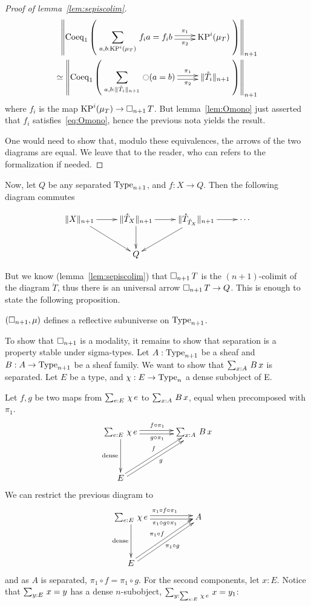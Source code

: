 \begin{proof}[Proof of lemma~\ref{lem:sepiscolim}]
  \[
    \begin{split}
    \left\|\mathrm{Coeq}_1 \left( 
      \xymatrix{
        \displaystyle{\sumD {a,b}{\KP^i(\mu_T)} {f_{i} a = f_{i} b}} \ar@<-.5ex>[r]_-{\pi_2} \ar@<.5ex>[r]^-{\pi_1} & \KP^i(\mu_T)
      }
    \right)\right\|_{n+1}
    \\ \simeq 
    \left\|\mathrm{Coeq}_1 \left( 
      \xymatrix{\displaystyle{\sumD {a,b} {\|\mathring T_i\|_{n+1}} {\modal (a=b)}} \ar@<-.5ex>[r]_-{\pi_2} \ar@<.5ex>[r]^-{\pi_1} & \|\mathring T_i\|_{n+1}}
    \right)\right\|_{n+1}
    \end{split}
  \]
  where $f_{i}$ is the map $\operatorname{KP}^i(\mu_T) \to \mathop{\square_{n+1}} T$. But
  lemma~\ref{lem:Omono} just asserted that $f_i$
  satisfies~\ref{eq:Omono}, hence the previous nota yields the result.
  
  One would need to show that, modulo these equivalences, the arrows
  of the two diagrams are equal. We leave that to the reader, who can
  refers to the formalization if needed.
\end{proof}

Now, let $Q$ be any separated $\operatorname{Type}_{n+1}$, and $f:X \to Q$. Then the
following diagram commutes

\[\xymatrix{
\|X\|_{n+1} \ar[r] \ar[rd] & \|\mathring T_{X}\|_{n+1} \ar[r] \ar[d] & \|\mathring
  T_{\mathring T_X} \|_{n+1} \ar[ld] \ar[r] & \cdots \\
  & Q &&
} \]%

But we know (lemma~\ref{lem:sepiscolim}) that $\mathop{\square_{n+1}} T$ is the
$(n+1)$-colimit of the diagram $\mathring T$, thus there is an universal
arrow $\mathop{\square_{n+1}} T \to Q$.
%
This is enough to state the following proposition.
\begin{prop}\label{prop:sep-subu}
  $(\mathop{\square_{n+1}},\mu)$ defines a reflective subuniverse on $\operatorname{Type}_{n+1}$.
\end{prop}

To show that $\mathop{\square_{n+1}}$ is a modality, it remains to show that
separation is a property stable under sigma-types.
%
Let $A:\operatorname{Type}_{n+1}$ be a sheaf and $B:A \to \operatorname{Type}_{n+1}$ be a sheaf
family. We want to show that $\sum_{x:A}\, B\, x$ is separated. Let $E$
be a type, and $\chi:E\to\operatorname{Type}_n$ a dense subobject of E.

Let $f,g$ be two maps from $\sum_{e:E}\, \chi\,e$ to $\sum_{x:A}\, B\, x$, equal when precomposed with $\pi_1$.
\[\xymatrix @R=4em @C=4em{
  \sumD e E {\chi\, e} \ar@<-2pt>[r]_{g\circ\pi_1}
  \ar@<2pt>[r]^{f\circ \pi_1} \ar[d]_{\mathrm{dense}}& \sumD x A {B\, x} \\
  E \ar@<-2pt>[ru]_{g} \ar@<2pt>[ru]^{f}&
}\]%
We can restrict the previous diagram to 
\[\xymatrix @R=4em @C=5em{
  \sumD e E {\chi\, e} \ar@<-2pt>[r]_{\pi_1\circ g\circ\pi_1} \ar@<2pt>[r]^{\pi_1\circ f\circ \pi_1} \ar[d]_{\mathrm{dense}}& A \\
  E \ar@<-2pt>[ru]_{\pi_1\circ g} \ar@<2pt>[ru]^{\pi_1\circ f}&
}\]%
and as $A$ is separated, $\pi_1\circ f = \pi_1 \circ g$.
For the second components, let $x:E$. Notice that 
$\sum_{y:E}\, x = y$ has a dense $n$-subobject, $\sum_{y:\sum_{e:E}\, \chi\,
  e}\, x=y_1$:

